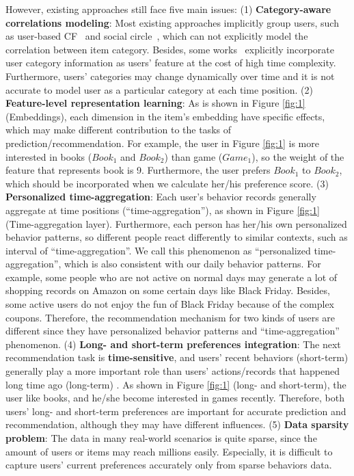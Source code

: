\documentclass[preprint,12pt]{elsarticle}
\begin{document}
\begin{sloppypar}
However, existing approaches still face five main issues: (1) \textbf{Category-aware correlations modeling}: Most existing approaches implicitly group users, such as user-based CF~\cite{chen2020deep, koohi2016user, bellogin2012using} and social circle~\cite{purushotham2012collaborative, qian2013personalized}, which can not explicitly model the correlation between item category. Besides, some works~\cite{papagelis2005qualitative, yang2012circle} explicitly incorporate user category information as users' feature at the cost of high time complexity. Furthermore, users' categories may change dynamically over time and it is not accurate to model user as a particular category at each time position. (2) \textbf{Feature-level representation learning}: As is shown in Figure \ref{fig:1} (Embeddings), each dimension in the item's embedding have specific effects, which may make different contribution to the tasks of prediction/recommendation. For example, the user in Figure \ref{fig:1} is more interested in books ($Book_1$ and $Book_2$) than game ($Game_1$), so the weight of the feature that represents book is 9. Furthermore, the user prefers $Book_1$ to $Book_2$, which should be incorporated when we calculate her/his preference score. (3) \textbf{Personalized time-aggregation}: Each user's behavior records generally aggregate at time positions (``time-aggregation''), as shown in Figure \ref{fig:1} (Time-aggregation layer). Furthermore, each person has her/his own personalized behavior patterns, so different people react differently to similar contexts, such as interval of ``time-aggregation''. We call this phenomenon as ``personalized time-aggregation'', which is also consistent with our daily behavior patterns. For example, some people who are not active on normal days may generate a lot of shopping records on Amazon on some certain days like Black Friday. Besides, some active users do not enjoy the fun of Black Friday because of the complex coupons. Therefore, the recommendation mechanism for two kinds of users are different since they have personalized behavior patterns and ``time-aggregation'' phenomenon.  (4) \textbf{Long- and short-term preferences integration}: The next recommendation task is \textbf {time-sensitive}, and users' recent behaviors (short-term) generally play a more important role than users' actions/records that happened long time ago (long-term) . As shown in Figure \ref{fig:1} (long- and short-term), the user like books, and he/she become interested in games recently. Therefore, both users' long- and short-term preferences are important for accurate prediction and recommendation, although they may have different influences.  (5) \textbf{Data sparsity problem}: The data in many real-world scenarios is quite sparse, since the amount of users or items may reach millions easily. Especially, it is difficult to capture users' current preferences accurately only from sparse behaviors data.


\end{sloppypar}
\end{document}
